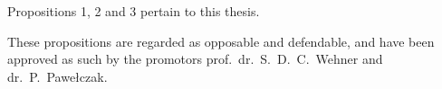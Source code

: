 \bigskip \noindent
Propositions 1, 2 and 3 pertain to this thesis.

\bigskip \noindent
These propositions are regarded as opposable and defendable, and have been approved as such by the
promotors prof.\ dr.\ S.\ D.\ C.\ Wehner and dr.\ P.\ Pawełczak.
